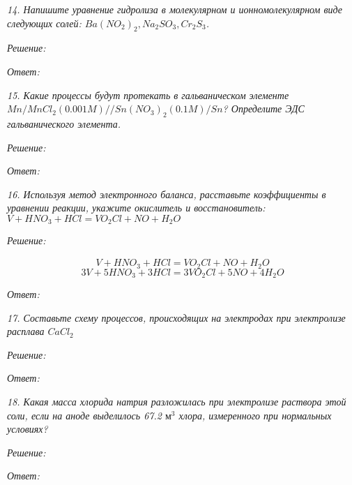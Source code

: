 \emph{14. Напишите уравнение гидролиза в молекулярном и 
ионномолекулярном виде следующих солей: 
\( Ba(NO_2)_2, Na_2 SO_3, Cr_2 S_3 \).}

\emph{Решение:}

\emph{Ответ: }

\pagebreak

\emph{15. Какие процессы будут протекать в гальваническом элементе 
\( Mn/MnCl_2(0.001 M)//Sn(NO_3)_2(0.1 M)/Sn \)? 
Определите ЭДС гальванического элемента.}

\emph{Решение:}

\emph{Ответ: }

\pagebreak

\emph{16. Используя метод электронного баланса, расставьте коэффициенты 
в уравнении реакции, укажите окислитель и восстановитель:
\( V + HNO_3 + HCl = VO_2 Cl + NO + H_2 O \) }

\emph{Решение:}

\[ 
	\stackrel{}{V} + \stackrel{}{H}\stackrel{}{N}\stackrel{}{O}_3 + 
	\stackrel{}{H}\stackrel{}{Cl} = \stackrel{}{V}\stackrel{}{O}_2
	\stackrel{}{Cl} + 
	\stackrel{}{N}\stackrel{}{O} + \stackrel{}{H}_2\stackrel{}{O} 
\]
\[ 3V + 5HNO_3 + 3HCl = 3VO_2 Cl + 5NO + 4H_2 O \]

\emph{Ответ: }

\pagebreak

\emph{17. Составьте схему процессов, происходящих на электродах при 
электролизе расплава \( CaCl_2 \)}

\emph{Решение:}

\emph{Ответ: }

\pagebreak

\emph{18. Какая масса хлорида натрия разложилась при электролизе раствора 
этой соли, если на аноде выделилось 67.2 \( \text{м}^3 \) хлора, 
измеренного при нормальных условиях?}

\emph{Решение:}

\emph{Ответ: }


